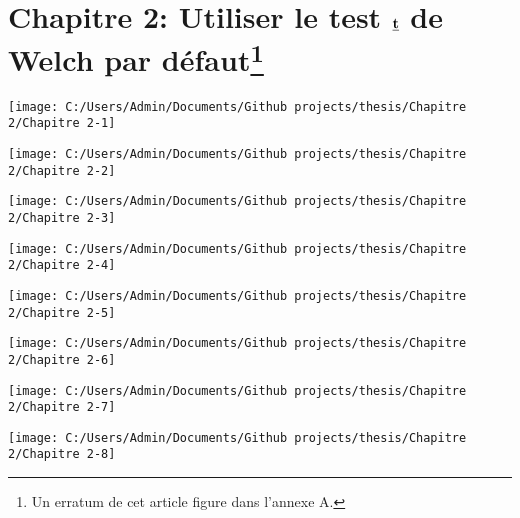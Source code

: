 \documentclass[
  12pt,
  french,
]{article}
\begin{document}
\newpage

\hypertarget{chapitre-2-utiliser-le-test-bf-emph-t-de-welch-par-duxe9faut}{%
\section[Chapitre 2: Utiliser le test \(\bf \emph t\) de Welch par
défaut]{\texorpdfstring{Chapitre 2: Utiliser le test \(\bf \emph t\) de
Welch par
défaut\footnote{Un erratum de cet article figure dans l'annexe A.}}{Chapitre 2: Utiliser le test \textbackslash bf \textbackslash emph t de Welch par défaut}}\label{chapitre-2-utiliser-le-test-bf-emph-t-de-welch-par-duxe9faut}}

\begin{center}\texttt{[image: C:/Users/Admin/Documents/Github projects/thesis/Chapitre 2/Chapitre 2-1]} \end{center}

\begin{center}\texttt{[image: C:/Users/Admin/Documents/Github projects/thesis/Chapitre 2/Chapitre 2-2]} \end{center}

\begin{center}\texttt{[image: C:/Users/Admin/Documents/Github projects/thesis/Chapitre 2/Chapitre 2-3]} \end{center}

\begin{center}\texttt{[image: C:/Users/Admin/Documents/Github projects/thesis/Chapitre 2/Chapitre 2-4]} \end{center}

\begin{center}\texttt{[image: C:/Users/Admin/Documents/Github projects/thesis/Chapitre 2/Chapitre 2-5]} \end{center}

\begin{center}\texttt{[image: C:/Users/Admin/Documents/Github projects/thesis/Chapitre 2/Chapitre 2-6]} \end{center}

\begin{center}\texttt{[image: C:/Users/Admin/Documents/Github projects/thesis/Chapitre 2/Chapitre 2-7]} \end{center}

\begin{center}\texttt{[image: C:/Users/Admin/Documents/Github projects/thesis/Chapitre 2/Chapitre 2-8]} \end{center}
\end{document}
